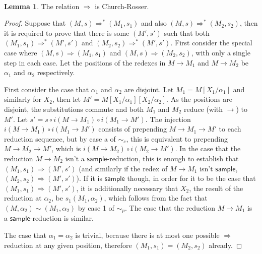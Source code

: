 \documentclass{article}
\newcommand{\tsample}{\mathsf{sample}}
\theoremstyle{definition}
\theoremstyle{lemma}
\newtheorem{lemma}{Lemma}
\theoremstyle{remark}
\begin{document}
\paragraph{}
\begin{lemma} \label{churchRosser}
The relation $\Rightarrow$ is Church-Rosser.
\end{lemma}
\begin{proof}
Suppose that $(M,s) \Rightarrow^* (M_1,s_1)$ and also $(M,s) \Rightarrow^* (M_2,s_2)$, then it is required to prove that there is some $(M',s')$ such that both $(M_1,s_1) \Rightarrow^* (M',s')$ and $(M_2,s_2) \Rightarrow^* (M',s')$. First consider the special case where $(M,s) \Rightarrow (M_1,s_1)$ and $(M,s) \Rightarrow (M_2,s_2)$, with only a single step in each case. Let the positions of the redexes in $M \to M_1$ and $M \to M_2$ be $\alpha_1$ and $\alpha_2$ respectively.

First consider the case that $\alpha_1$ and $\alpha_2$ are disjoint. Let $M_1 = M[X_1/\alpha_1]$ and similarly for $X_2$, then let $M' = M[X_1/\alpha_1][X_2/\alpha_2]$. As the positions are disjoint, the substitutions commute and both $M_1$ and $M_2$ reduce (with $\to$) to $M'$. 
Let $s' = s \circ i(M \to M_1) \circ i(M_1 \to M')$. 
The injection $i(M \to M_1) \circ i(M_1 \to M')$ consists of prepending $M \to M_1 \to M'$ to each reduction sequence, but by case a of $\sim_c$, this is equivalent to prepending $M \to M_2 \to M'$, which is $i(M \to M_2) \circ i(M_2 \to M')$. 
In the case that the reduction $M \to M_2$ isn't a $\tsample$-reduction, this is enough to establish that $(M_1, s_1) \Rightarrow (M', s')$ (and similarly if the redex of $M \to M_1$ isn't $\tsample$, $(M_2,s_2) \Rightarrow (M',s')$).
If it is $\tsample$ though, in order for it to be the case that $(M_1, s_1) \Rightarrow (M', s')$, it is additionally necessary that $X_2$, the result of the reduction at $\alpha_2$, be $s_1(M_1, \alpha_2)$, which follows from the fact that $(M, \alpha_2) \sim (M_1, \alpha_2)$ by case 1 of $\sim_p$. 
The case that the reduction $M \to M_1$ is a $\tsample$-reduction is similar.

The case that $\alpha_1 = \alpha_2$ is trivial, because there is at most one possible $\Rightarrow$ reduction at any given position, therefore $(M_1, s_1) = (M_2, s_2)$ already.


\end{proof}
\end{document}
